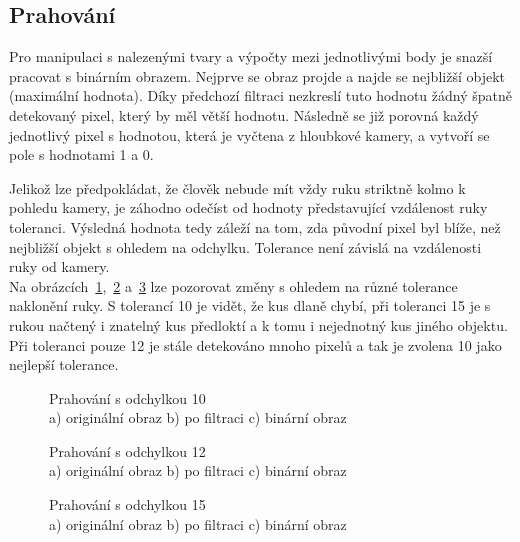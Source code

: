 \subsection{Prahování}
Pro manipulaci s nalezenými tvary a výpočty mezi jednotlivými body je snazší pracovat s binárním obrazem. Nejprve se obraz projde a najde se nejbližší objekt (maximální hodnota). Díky předchozí filtraci nezkreslí tuto hodnotu žádný špatně detekovaný pixel, který by měl větší hodnotu. Následně se již porovná každý jednotlivý pixel s hodnotou, která je vyčtena z hloubkové kamery, a vytvoří se pole s hodnotami 1 a 0.

Jelikož lze předpokládat, že člověk nebude mít vždy ruku striktně kolmo k pohledu kamery, je záhodno odečíst od hodnoty představující vzdálenost ruky toleranci. Výsledná hodnota tedy záleží na tom, zda původní pixel byl blíže, než nejbližší objekt s ohledem na odchylku. Tolerance není závislá na vzdálenosti ruky od kamery.\\
Na obrázcích~\ref{pic12},~\ref{pic13} a~\ref{pic14} lze pozorovat změny s ohledem na různé tolerance naklonění ruky. S tolerancí 10 je vidět, že kus dlaně chybí, při toleranci 15 je s rukou načtený i znatelný kus předloktí a k tomu i nejednotný kus jiného objektu. Při toleranci pouze 12 je stále detekováno mnoho pixelů a tak je zvolena 10 jako nejlepší tolerance.\\

\begin{figure}[htp]
\centering
{} \hfill
{} \hfill
{}
\caption{Prahování s odchylkou 10 \\ a) originální obraz b) po filtraci c) binární obraz}
\label{pic12}
\end{figure}
\begin{figure}[htp]
\centering
{} \hfill
{} \hfill
{}
\caption{Prahování s odchylkou 12 \\ a) originální obraz b) po filtraci c) binární obraz}
\label{pic13}
\end{figure}
\begin{figure}[htp]
\centering
{} \hfill
{} \hfill
{}
\caption{Prahování s odchylkou 15 \\ a) originální obraz b) po filtraci c) binární obraz}
\label{pic14}
\end{figure}
\newpage
